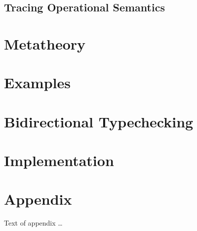 \documentclass[acmsmall,review,anonymous]{acmart}\settopmatter{printfolios=true,printccs=false,printacmref=false}
\begin{document}
\subsection{Tracing Operational Semantics}

\section{Metatheory}

\section{Examples}

\section{Bidirectional Typechecking}

\section{Implementation}





%


\appendix
\section{Appendix}

Text of appendix \ldots
\end{document}
